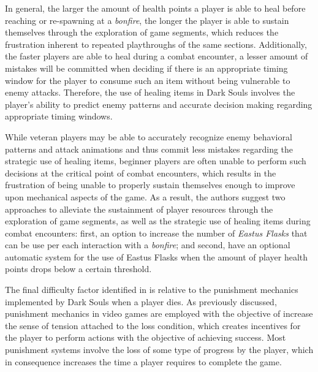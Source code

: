 In general, the larger the amount of health points a player is able to heal before reaching or re-spawning at a \emph{bonfire}, the longer the player is able to sustain themselves through the exploration of game segments, which reduces the frustration inherent to repeated playthroughs of the same sections. Additionally, the faster players are able to heal during a combat encounter, a lesser amount of mistakes will be committed when deciding if there is an appropriate timing window for the player to consume such an item without being vulnerable to enemy attacks. Therefore, the use of healing items in Dark Souls involves the player's ability to predict enemy patterns and accurate decision making regarding appropriate timing windows.

While veteran players may be able to accurately recognize enemy behavioral patterns and attack animations and thus commit less mistakes regarding the strategic use of healing items, beginner players are often unable to perform such decisions at the critical point of combat encounters, which results in the frustration of being unable to properly sustain themselves enough to improve upon mechanical aspects of the game. As a result, the authors suggest two approaches to alleviate the sustainment of player resources through the exploration of game segments, as well as the strategic use of healing items during combat encounters: first, an option to increase the number of \emph{Eastus Flasks} that can be use per each interaction with a \emph{bonfire}; and second, have an optional automatic system for the use of Eastus Flasks when the amount of player health points drops below a certain threshold.

The final difficulty factor identified in \cite{ONLINE_ApproachabilityFixDarkSouls} is relative to the punishment mechanics implemented by Dark Souls when a player dies. As previously discussed, punishment mechanics in video games are employed with the objective of increase the sense of tension attached to the loss condition, which creates incentives for the player to perform actions with the objective of achieving success. Most punishment systems involve the loss of some type of progress by the player, which in consequence increases the time a player requires to complete the game.


